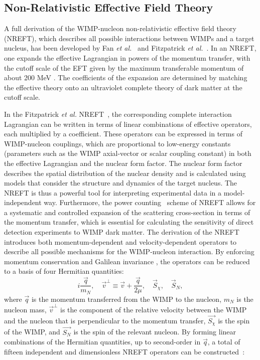 \documentclass[reprint, showpacs,
preprintnumbers,
amsmath,amssymb,
aps, floatfix,
superscriptaddress,
prd, nofootinbib]{revtex4-1}
\begin{document}
\subsection{\label{subsec:theory}Non-Relativistic Effective Field Theory} 
A full derivation of the WIMP-nucleon non-relativistic effective field theory (NREFT), which describes all possible interactions between WIMPs and a target nucleus, has been developed by Fan \textit{et al.}~\cite{Fan_2010} and Fitzpatrick \textit{et al.}~\cite{Fitzpatrick:EFT}.
In an NREFT, one expands the effective Lagrangian in powers of the momentum transfer, with the cutoff scale of the EFT given by the maximum transferable momentum of about 200 MeV \cite{Fitzpatrick:EFT}.
The coefficients of the expansion are determined by matching the effective theory onto an ultraviolet complete theory of dark matter at the cutoff scale.
\par
In the Fitzpatrick \textit{et al.} NREFT~\cite{Fitzpatrick:EFT}, the corresponding complete interaction Lagrangian can be written in terms of linear combinations of effective operators, each multiplied by a coefficient. 
These operators can be expressed in terms of WIMP-nucleon couplings, which are proportional to low-energy constants (parameters such as the WIMP axial-vector or scalar coupling constant) in both the effective Lagrangian and the nuclear form factor. 
The nuclear form factor describes the spatial distribution of the nuclear density and is calculated using models that consider the structure and dynamics of the target nucleus.
The NREFT is thus a powerful tool for interpreting experimental data in a model-independent way. 
Furthermore, the power counting~\cite{BUCHALLA201480:EFT} scheme of NREFT allows for a systematic and controlled expansion of the scattering cross-section in terms of the momentum transfer, which is essential for calculating the sensitivity of direct detection experiments to WIMP dark matter.
The derivation of the NREFT introduces both momentum-dependent and velocity-dependent operators to describe all possible mechanisms for the WIMP-nucleon interaction. 
By enforcing momentum conservation and Galilean invariance \cite{Fitzpatrick:EFT}, the operators can be reduced to a basis of four Hermitian quantities:
\begin{equation}
i \frac{\vec{q}}{m_N}, \quad \vec{v}^\perp \equiv \vec{v} + \frac{\vec{q}}{2\mu}, \quad \vec{S}_{\chi}, \quad \vec{S}_{N},
\label{eq:basis}
\end{equation}
\noindent where $\vec{q}$ is the momentum transferred from the WIMP to the nucleon, $m_N$ is the nucleon mass, $\vec{v}^\perp$ is the component of the relative velocity between the WIMP and the nucleon that is perpendicular to the momentum transfer, $\vec{S_\chi}$ is the spin of the WIMP, and $\vec{S_N}$ is the spin of the relevant nucleon. 
By forming linear combinations of the Hermitian quantities, up to second-order in $\vec{q}$, a total of  fifteen independent and dimensionless NREFT operators can be constructed~\cite{Anand:MathematicaEFT}:
\end{document}
